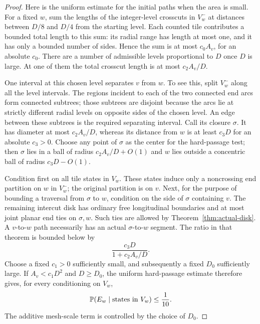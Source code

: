 \begin{proof}
Here is the uniform estimate for the initial paths when the area is
small.  For a fixed $w$, sum the lengths of the integer-level crosscuts
in $V_w^-$ at distances between $D/8$ and $D/4$ from the starting level.
Each counted tile contributes a bounded total length to this sum: its
radial range has length at most one, and it has only a bounded number
of sides.  Hence the sum is at most $c_0 A_v$, for an absolute $c_0$.
There are a number of admissible levels proportional to $D$ once $D$
is large.  At one of them the total crosscut length is at most
$c_2 A_v/D$.

One interval at this chosen level separates $v$ from $w$.  To see this,
split $V_w^-$ along all the level intervals.  The regions incident to
each of the two connected end arcs form connected subtrees; those
subtrees are disjoint because the arcs lie at strictly different radial
levels on opposite sides of the chosen level.  An edge between these
subtrees is the required separating interval.  Call its closure $\sigma$.
It has diameter at most $c_2 A_v/D$, whereas its distance from $w$ is at
least $c_3D$ for an absolute $c_3>0$.
Choose any point of $\sigma$ as the center for the hard-passage test;
then $\sigma$ lies in a ball of radius $c_2 A_v/D+O(1)$ and $w$ lies
outside a concentric ball of radius $c_3D-O(1)$.

Condition first on all tile states in $V_w$.  These states induce only
a noncrossing end partition on $w$ in $V_w^-$; the original partition is
on $v$.  Next, for the purpose of bounding a traversal from $\sigma$ to
$w$, condition on the side of $\sigma$ containing $v$.  The remaining
intercut disk has ordinary free longitudinal boundaries and at most
joint planar end ties on $\sigma,w$.  Such ties are allowed by
Theorem~\ref{thm:actual-disk}.  A $v$-to-$w$ path necessarily has an
actual $\sigma$-to-$w$ segment.  The ratio in that theorem is bounded
below by
\[
 \frac{c_3D}{1+c_2 A_v/D}.
\]
Choose a fixed $c_1>0$ sufficiently small, and subsequently a fixed
$D_0$ sufficiently large.  If $A_v<c_1D^2$ and $D\ge D_0$, the uniform
hard-passage estimate therefore gives, for every conditioning on
$V_w$,
\begin{equation}\label{eq:disk-branching-initial}
 \mathbb P(E_w\mid\text{states in }V_w)\le\frac1{10}.
\end{equation}
The additive mesh-scale term is controlled by the choice of $D_0$.


\end{proof}
